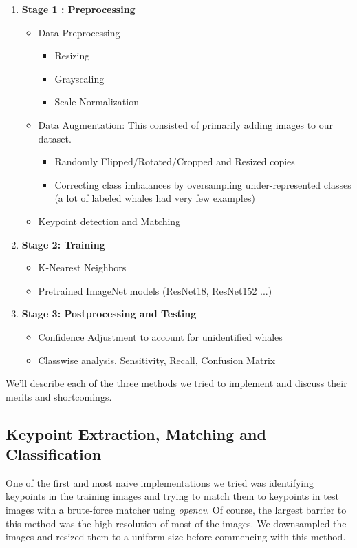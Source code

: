 \begin{enumerate}
	\item \textbf{Stage 1 : Preprocessing}
	\begin{itemize}
		\item Data Preprocessing
		\begin{itemize}
			\item Resizing
			\item Grayscaling
			\item Scale Normalization
		\end{itemize}
		\item Data Augmentation: This consisted of primarily adding images to our dataset.
		\begin{itemize}
			\item Randomly Flipped/Rotated/Cropped and Resized copies
			\item Correcting class imbalances by oversampling under-represented classes (a lot of labeled whales had very few examples)
		\end{itemize}
		\item Keypoint detection and Matching
	\end{itemize}
	\item \textbf{Stage 2: Training}
	\begin{itemize}
		\item K-Nearest Neighbors
		\item Pretrained ImageNet models (ResNet18, ResNet152 ...)
	\end{itemize}
	\item \textbf{Stage 3: Postprocessing and Testing}
	\begin{itemize}
		\item Confidence Adjustment to account for unidentified whales
		\item Classwise analysis, Sensitivity, Recall, Confusion Matrix
	\end{itemize}
\end{enumerate}

We'll describe each of the three methods we tried to implement and discuss their merits and shortcomings.

\subsection{Keypoint Extraction, Matching and Classification}

One of the first and most naive implementations we tried was identifying keypoints in the training images and trying to match them to keypoints in test images with a brute-force matcher using \textit{opencv}. Of course, the largest barrier to this method was the high resolution of most of the images. We downsampled the images and resized them to a uniform size before commencing with this method. 

